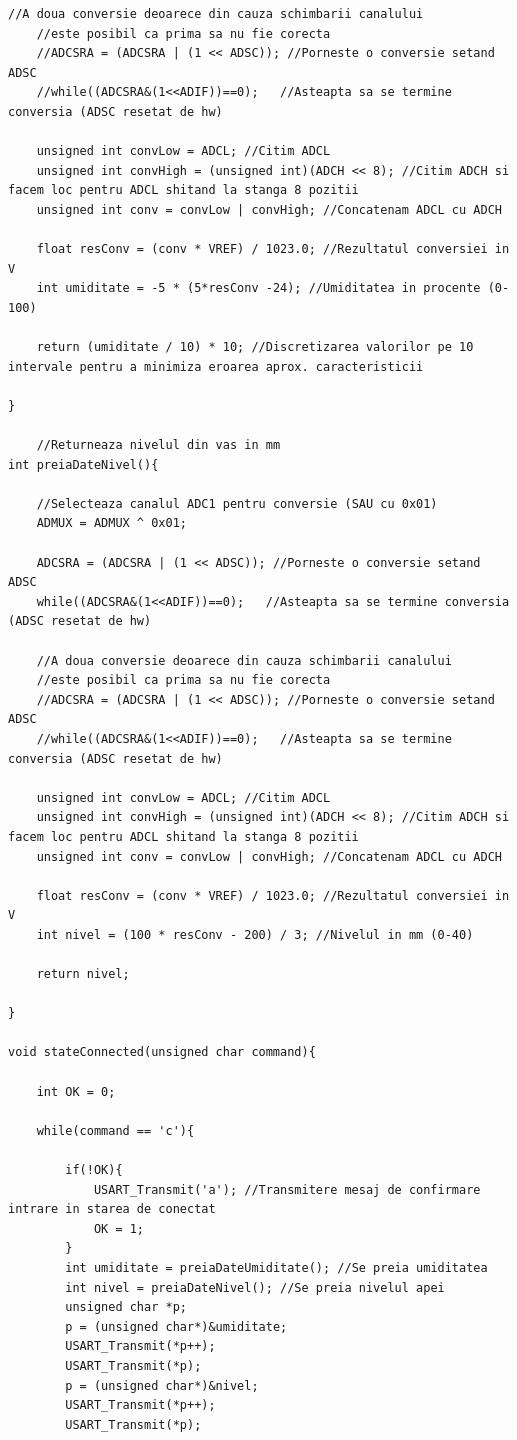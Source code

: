 \documentclass[12pt]{article}
\begin{document}
\begin{lstlisting}[style=CStyle]
	//A doua conversie deoarece din cauza schimbarii canalului
	//este posibil ca prima sa nu fie corecta
	//ADCSRA = (ADCSRA | (1 << ADSC)); //Porneste o conversie setand ADSC
	//while((ADCSRA&(1<<ADIF))==0);   //Asteapta sa se termine conversia (ADSC resetat de hw)
	
	unsigned int convLow = ADCL; //Citim ADCL
	unsigned int convHigh = (unsigned int)(ADCH << 8); //Citim ADCH si facem loc pentru ADCL shitand la stanga 8 pozitii
	unsigned int conv = convLow | convHigh; //Concatenam ADCL cu ADCH
	
	float resConv = (conv * VREF) / 1023.0; //Rezultatul conversiei in V
	int umiditate = -5 * (5*resConv -24); //Umiditatea in procente (0-100)
	
	return (umiditate / 10) * 10; //Discretizarea valorilor pe 10 intervale pentru a minimiza eroarea aprox. caracteristicii
	
}

	//Returneaza nivelul din vas in mm
int preiaDateNivel(){
	
	//Selecteaza canalul ADC1 pentru conversie (SAU cu 0x01)
	ADMUX = ADMUX ^ 0x01;
	
	ADCSRA = (ADCSRA | (1 << ADSC)); //Porneste o conversie setand ADSC
	while((ADCSRA&(1<<ADIF))==0);   //Asteapta sa se termine conversia (ADSC resetat de hw)
	
	//A doua conversie deoarece din cauza schimbarii canalului
	//este posibil ca prima sa nu fie corecta
	//ADCSRA = (ADCSRA | (1 << ADSC)); //Porneste o conversie setand ADSC
	//while((ADCSRA&(1<<ADIF))==0);   //Asteapta sa se termine conversia (ADSC resetat de hw)
	
	unsigned int convLow = ADCL; //Citim ADCL
	unsigned int convHigh = (unsigned int)(ADCH << 8); //Citim ADCH si facem loc pentru ADCL shitand la stanga 8 pozitii
	unsigned int conv = convLow | convHigh; //Concatenam ADCL cu ADCH
	
	float resConv = (conv * VREF) / 1023.0; //Rezultatul conversiei in V
	int nivel = (100 * resConv - 200) / 3; //Nivelul in mm (0-40)
	
	return nivel;
	
}

void stateConnected(unsigned char command){
	
	int OK = 0;
	
	while(command == 'c'){
		
		if(!OK){
			USART_Transmit('a'); //Transmitere mesaj de confirmare intrare in starea de conectat
			OK = 1;
		}
		int umiditate = preiaDateUmiditate(); //Se preia umiditatea
		int nivel = preiaDateNivel(); //Se preia nivelul apei
		unsigned char *p;
		p = (unsigned char*)&umiditate;
		USART_Transmit(*p++);
		USART_Transmit(*p);
		p = (unsigned char*)&nivel;
		USART_Transmit(*p++);
		USART_Transmit(*p);
		

\end{lstlisting}
\end{document}
